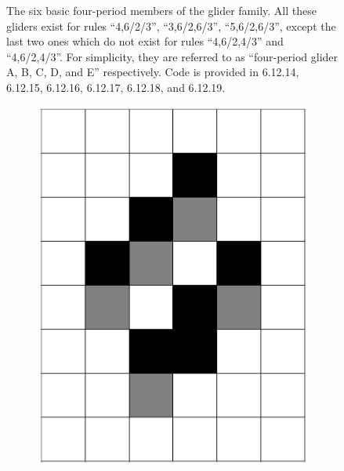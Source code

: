 \documentclass[12pt]{article}
\numberwithin{figure}{section} %
\begin{document}
\begin{figure}[H]
   \caption{The six basic four-period members of the glider family. All these gliders exist for rules “4,6/2/3”, “3,6/2,6/3”, “5,6/2,6/3”, except the last two ones which do not exist for rules “4,6/2,4/3” and “4,6/2,4/3”. For simplicity, they are referred to as “four-period glider A, B, C, D, and E” respectively. Code is provided in 6.12.14, 6.12.15, 6.12.16, 6.12.17, 6.12.18, and 6.12.19. }
   \vspace{-1.5em}
\end{figure}

\begin{figure}[H]
  \begin{subfigure}{0.19\textwidth}
     \centering
     \includegraphics[width=\linewidth]{Section4/21.0}
     \subcaption{}
   \end{subfigure}
     \begin{subfigure}{0.19\textwidth}
     \centering

\end{subfigure}
\end{figure}
\end{document}
